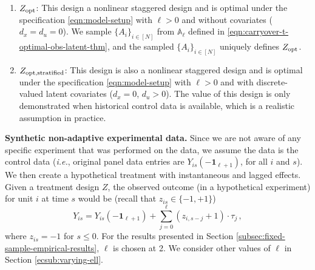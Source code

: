 \begin{enumerate}
\begin{enumerate}
		\item $Z_{\textnormal{opt}}$: This design a nonlinear staggered design and is optimal under the specification \eqref{eqn:model-setup} with $\ell > 0$ and without covariates ($d_x = d_u = 0$). We sample $\{A_i\}_{i \in [N]}$ from $\mathbb{A}_{\ell}$ defined in \eqref{eqn:carryover-t-optimal-obs-latent-thm}, and the sampled $\{A_i\}_{i \in [N]}$ uniquely defines $Z_{\textnormal{opt}}$.  
		
		
		\item $Z_{\textnormal{opt},\mathrm{stratified}}$: This design is also a nonlinear staggered design and is optimal under the specification \eqref{eqn:model-setup} with $\ell > 0$ and with discrete-valued latent covariates ($d_x = 0$, $d_u > 0$). 
		The value of this design is only demonstrated when historical control data is available, which is a realistic assumption in practice.   
	
		\end{enumerate}
		
	\end{enumerate}
	
    {\bf Synthetic non-adaptive experimental data.}
    Since we are not aware of any specific experiment that was performed on the data, we assume the data is the control data ({\it i.e.}, original panel data entries are $Y_{is}(-\bm{1}_{\ell+1})$, for all $i$ and $s$). We then create a hypothetical treatment with instantaneous and lagged effects. Given a treatment design $Z$, the observed outcome (in a hypothetical experiment) for unit $i$ at time $s$ would be (recall that $z_{is} \in \{-1,+1\}$)
	\[
	Y_{is} = Y_{is}(-\bm{1}_{\ell+1}) + \sum_{j = 0}^{\ell} (z_{i,s-j} + 1) \cdot \tau_j\,, 
	\]
	where $z_{is} = -1$ for $s \leq 0$. 
    For the results presented in Section \ref{subsec:fixed-sample-empirical-results}, $\ell$ is chosen at 2. We consider other values of $\ell$ in Section \ref{ecsub:varying-ell}. 

